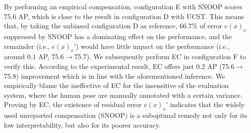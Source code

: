 \documentclass[10pt,journal,compsoc]{IEEEtran}
\begin{document}
By performing an empirical compensation, configuration E with SNOOP scores 75.6 AP, which is close to the result in configuration D with UCST. This means that, by taking the unbiased configuration D as reference, $66.7\%$ of error $e(x)_o$ suppressed by SNOOP has a dominating effect on the performance, and the remainder (i.e., $e(x)_o'$) would have little impact on the performance (i.e., around 0.1 AP, 75.6$\rightarrow$75.7). We subsequently perform EC in configuration F to verify this. According to the experimental result, EC offers just 0.2 AP (75.6$\rightarrow$75.8) improvement which is in line with the aforementioned inference. We empirically blame the ineffective of EC for the insensitive of the evaluation system, where the human pose are manually annotated with a certain variance. Proving by EC, the existence of residual error $e(x)_o'$ indicates that the widely used unreported compensation (SNOOP) is a suboptimal remedy not only for its low interpretability, but also for its poorer accuracy.
\end{document}
